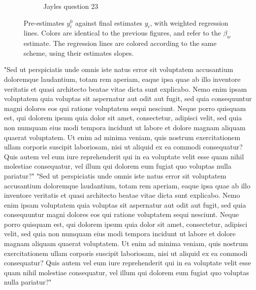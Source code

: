 \documentclass[9pt,twoside,lineno]{pnas-new}
\begin{document}
\begin{figure}[htbp]
\begin{subfigure}[b]{.24\textwidth}
		\caption{Jayles question 23}
	\end{subfigure}
	\caption{Pre-estimates $y_i^0$ against final estimates $y_i$, with weighted regression lines. Colors are identical to the previous figures, and refer to the $\beta_w$ estimate. The regression lines are colored according to the same scheme, using their estimates slopes.}\label{fig: Jayles estimate vs pre-estimate}
\end{figure}

"Sed ut perspiciatis unde omnis iste natus error sit voluptatem accusantium doloremque laudantium, totam rem aperiam, eaque ipsa quae ab illo inventore veritatis et quasi architecto beatae vitae dicta sunt explicabo. Nemo enim ipsam voluptatem quia voluptas sit aspernatur aut odit aut fugit, sed quia consequuntur magni dolores eos qui ratione voluptatem sequi nesciunt. Neque porro quisquam est, qui dolorem ipsum quia dolor sit amet, consectetur, adipisci velit, sed quia non numquam eius modi tempora incidunt ut labore et dolore magnam aliquam quaerat voluptatem. Ut enim ad minima veniam, quis nostrum exercitationem ullam corporis suscipit laboriosam, nisi ut aliquid ex ea commodi consequatur? Quis autem vel eum iure reprehenderit qui in ea voluptate velit esse quam nihil molestiae consequatur, vel illum qui dolorem eum fugiat quo voluptas nulla pariatur?"
"Sed ut perspiciatis unde omnis iste natus error sit voluptatem accusantium doloremque laudantium, totam rem aperiam, eaque ipsa quae ab illo inventore veritatis et quasi architecto beatae vitae dicta sunt explicabo. Nemo enim ipsam voluptatem quia voluptas sit aspernatur aut odit aut fugit, sed quia consequuntur magni dolores eos qui ratione voluptatem sequi nesciunt. Neque porro quisquam est, qui dolorem ipsum quia dolor sit amet, consectetur, adipisci velit, sed quia non numquam eius modi tempora incidunt ut labore et dolore magnam aliquam quaerat voluptatem. Ut enim ad minima veniam, quis nostrum exercitationem ullam corporis suscipit laboriosam, nisi ut aliquid ex ea commodi consequatur? Quis autem vel eum iure reprehenderit qui in ea voluptate velit esse quam nihil molestiae consequatur, vel illum qui dolorem eum fugiat quo voluptas nulla pariatur?"
\end{document}
